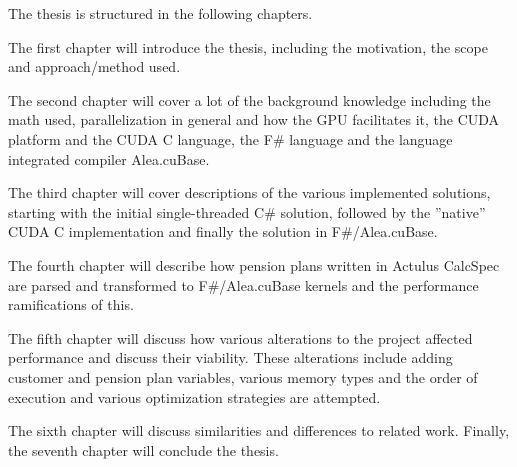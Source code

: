 The thesis is structured in the following chapters.

The first chapter will introduce the thesis, including the motivation, the scope and approach/method used.

The second chapter will cover a lot of the background knowledge including the math used, parallelization in general and how the GPU facilitates it, the CUDA platform and the CUDA C language, the F\# language and the language integrated compiler Alea.cuBase.

The third chapter will cover descriptions of the various implemented solutions, starting with the initial single-threaded C\# solution, followed by the ''native'' CUDA C implementation and finally the solution in F\#/Alea.cuBase.

The fourth chapter will describe how pension plans written in Actulus CalcSpec are parsed and transformed to F\#/Alea.cuBase kernels and the performance ramifications of this.

The fifth chapter will discuss how various alterations to the project affected performance and discuss their viability. These alterations include adding customer and pension plan variables, various memory types and the order of execution and various optimization strategies are attempted.

The sixth chapter will discuss similarities and differences to related work.
Finally, the seventh chapter will conclude the thesis.